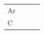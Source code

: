 \begin{enumerate}[noitemsep, label=\textbf{\arabic*}. ]
{\begin{tabular}[t]{|l|l|l|l|}
    
        \begin{math}\mathrm{Ar}\end{math} &
    
    
         &
    
    
         &
    
    
     \tabularnewline\cline{1-1}\cline{2-2}\cline{3-3}\cline{4-4}
    
    
        \begin{math}\mathrm{C}\end{math} &
    
    
         &
    
    
         &
    
    
     \tabularnewline\cline{1-1}\cline{2-2}\cline{3-3}\cline{4-4}
    

\end{tabular}}
\end{enumerate}
